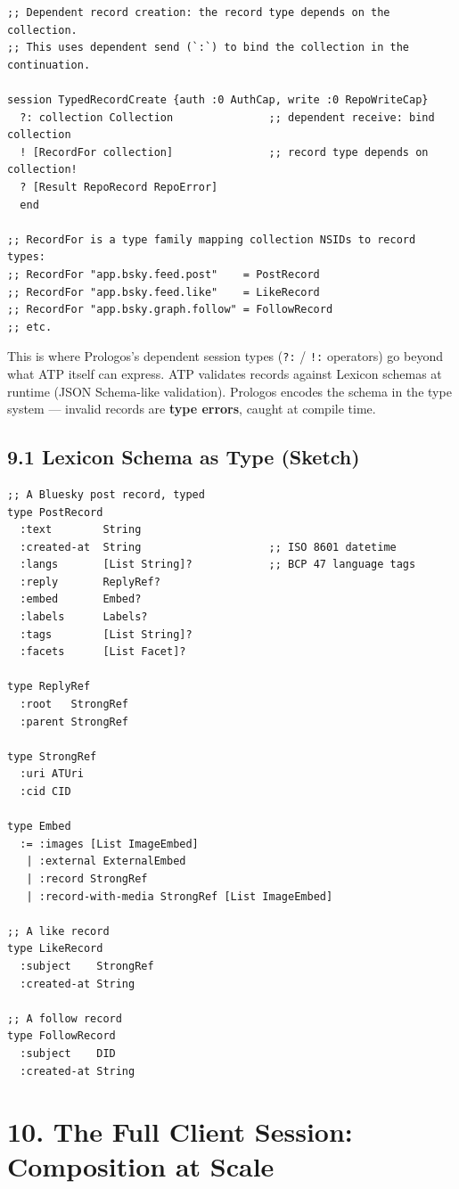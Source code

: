 \documentclass[11pt]{article}
\begin{document}
\begin{verbatim}
;; Dependent record creation: the record type depends on the collection.
;; This uses dependent send (`:`) to bind the collection in the continuation.

session TypedRecordCreate {auth :0 AuthCap, write :0 RepoWriteCap}
  ?: collection Collection               ;; dependent receive: bind collection
  ! [RecordFor collection]               ;; record type depends on collection!
  ? [Result RepoRecord RepoError]
  end

;; RecordFor is a type family mapping collection NSIDs to record types:
;; RecordFor "app.bsky.feed.post"    = PostRecord
;; RecordFor "app.bsky.feed.like"    = LikeRecord
;; RecordFor "app.bsky.graph.follow" = FollowRecord
;; etc.
\end{verbatim}

This is where Prologos's dependent session types (\texttt{?:} / \texttt{!:} operators)
go beyond what ATP itself can express. ATP validates records against Lexicon
schemas at runtime (JSON Schema-like validation). Prologos encodes the
schema in the type system — invalid records are \textbf{type errors}, caught at
compile time.
\subsection{9.1 Lexicon Schema as Type (Sketch)}
\label{sec:org8fc51a7}

\begin{verbatim}
;; A Bluesky post record, typed
type PostRecord
  :text        String
  :created-at  String                    ;; ISO 8601 datetime
  :langs       [List String]?            ;; BCP 47 language tags
  :reply       ReplyRef?
  :embed       Embed?
  :labels      Labels?
  :tags        [List String]?
  :facets      [List Facet]?

type ReplyRef
  :root   StrongRef
  :parent StrongRef

type StrongRef
  :uri ATUri
  :cid CID

type Embed
  := :images [List ImageEmbed]
   | :external ExternalEmbed
   | :record StrongRef
   | :record-with-media StrongRef [List ImageEmbed]

;; A like record
type LikeRecord
  :subject    StrongRef
  :created-at String

;; A follow record
type FollowRecord
  :subject    DID
  :created-at String
\end{verbatim}
\section{10. The Full Client Session: Composition at Scale}
\label{sec:orge0def6f}
\end{document}
